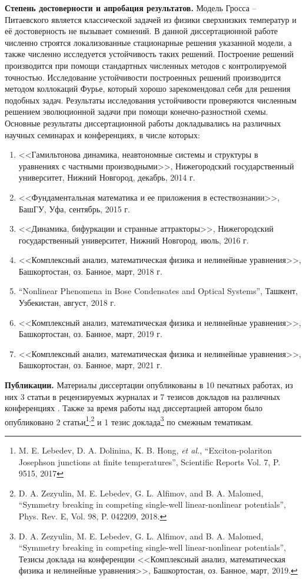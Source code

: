 \documentclass[candidate, href, colorlinks]{disser}
\begin{document}
\textbf{Степень достоверности и апробация результатов.}
Модель Гросса -- Питаевского является классической задачей из физики сверхнизких температур и её достоверность не вызывает сомнений.
В данной диссертационной работе численно строятся локализованные стационарные решения указанной модели, а также численно исследуется устойчивость таких решений.
Построение решений производится при помощи стандартных численных методов с контролируемой точностью.
Исследование устойчивости построенных решений производится методом коллокаций Фурье, который хорошо зарекомендовал себя для решения подобных задач.
Результаты исследования устойчивости проверяются численным решением эволюционной задачи при помощи конечно-разностной схемы.
Основные результаты диссертационной работы докладывались на различных научных семинарах и конференциях, в числе которых:
\begin{enumerate}
	\item <<Гамильтонова динамика, неавтономные системы и структуры в уравнениях с частными производными>>, Нижегородский государственный университет, Нижний Новгород, декабрь, 2014 г.
	\item <<Фундаментальная математика и ее приложения в естествознании>>, БашГУ, Уфа, сентябрь, 2015 г.
	\item <<Динамика, бифуркации и странные аттракторы>>, Нижегородский государственный университет, Нижний Новгород, июль, 2016 г.
	\item <<Комплексный анализ, математическая физика и нелинейные уравнения>>, Башкортостан, оз. Банное, март, 2018 г.
	\item ``Nonlinear Phenomena in Bose Condensates and Optical Systems'', Ташкент, Узбекистан, август, 2018 г.
	\item <<Комплексный анализ, математическая физика и нелинейные уравнения>>, Башкортостан, оз. Банное, март, 2019 г.
	\item <<Комплексный анализ, математическая физика и нелинейные уравнения>>, Башкортостан, оз. Банное, март, 2021 г.
\end{enumerate}

\textbf{Публикации.}
Материалы диссертации опубликованы в 10 печатных работах, из них 3 статьи в рецензируемых журналах \cite{AlfimovLebedev, LebedevAlfimovMalomed, AlfimovGegelLebedevMalomedZezyulin} и 7 тезисов докладов на различных конференциях \cite{NizhniNovgorod2014, Ufa2015, NizhniNovgorod2016, Bannoe2018, Tashkent2018, Bannoe2019, Bannoe2021}.
Также за время работы над диссертацией автором было опубликовано 2 статьи\footnote{M. E. Lebedev, D. A. Dolinina, K. B. Hong, {\it et al.}, ``Exciton-polariton Josephson junctions at finite temperatures'', Scientific Reports Vol. 7, P. 9515, 2017}\textsuperscript{,}\footnote{D. A. Zezyulin, M. E. Lebedev, G. L. Alfimov, and B. A. Malomed, ``Symmetry breaking in competing single-well linear-nonlinear potentials'', Phys. Rev. E, Vol. 98, P. 042209, 2018.} и 1 тезис доклада\footnote{D. A. Zezyulin, M. E. Lebedev, G. L. Alfimov, and B. A. Malomed, ``Symmetry breaking in competing single-well linear-nonlinear potentials'', Тезисы доклада на конференции <<Комплексный анализ, математическая физика и нелинейные уравнения>>, Башкортостан, оз. Банное, март, 2019.} по смежным тематикам.
\end{document}
